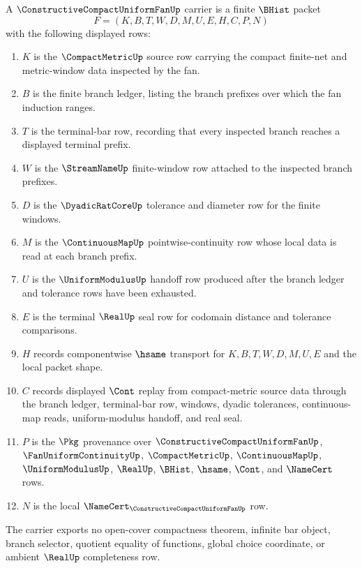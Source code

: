 \begin{definition}
\label{def:constructive-compact-uniform-fan-carrier}
A $\ConstructiveCompactUniformFanUp$ carrier is a finite $\BHist$ packet
$$
F=(K,B,T,W,D,M,U,E,H,C,P,N)
$$
with the following displayed rows:
\begin{enumerate}
\item $K$ is the $\CompactMetricUp$ source row carrying the compact finite-net and metric-window data inspected by the fan.
\item $B$ is the finite branch ledger, listing the branch prefixes over which the fan induction ranges.
\item $T$ is the terminal-bar row, recording that every inspected branch reaches a displayed terminal prefix.
\item $W$ is the $\StreamNameUp$ finite-window row attached to the inspected branch prefixes.
\item $D$ is the $\DyadicRatCoreUp$ tolerance and diameter row for the finite windows.
\item $M$ is the $\ContinuousMapUp$ pointwise-continuity row whose local data is read at each branch prefix.
\item $U$ is the $\UniformModulusUp$ handoff row produced after the branch ledger and tolerance rows have been exhausted.
\item $E$ is the terminal $\RealUp$ seal row for codomain distance and tolerance comparisons.
\item $H$ records componentwise $\hsame$ transport for $K,B,T,W,D,M,U,E$ and the local packet shape.
\item $C$ records displayed $\Cont$ replay from compact-metric source data through the branch ledger, terminal-bar row, windows, dyadic tolerances, continuous-map reads, uniform-modulus handoff, and real seal.
\item $P$ is the $\Pkg$ provenance over $\ConstructiveCompactUniformFanUp$, $\FanUniformContinuityUp$, $\CompactMetricUp$, $\ContinuousMapUp$, $\UniformModulusUp$, $\RealUp$, $\BHist$, $\hsame$, $\Cont$, and $\NameCert$ rows.
\item $N$ is the local $\NameCert_{\ConstructiveCompactUniformFanUp}$ row.
\end{enumerate}
The carrier exports no open-cover compactness theorem, infinite bar object, branch selector, quotient equality of functions, global choice coordinate, or ambient $\RealUp$ completeness row.
\end{definition}

